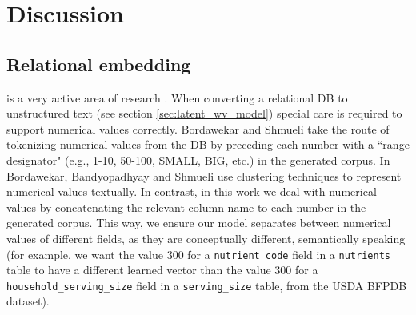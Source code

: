 \chapter{Discussion}
\label{chap:discussion}


\section{Relational embedding} is a very active area of research \cite{DBLP:journals/corr/abs-1803-01384, sigmod2020_keynote, pie2020_keynote}.
When converting a relational DB to unstructured text (see section \ref{sec:latent_wv_model}) special care is required to support numerical values correctly. Bordawekar and Shmueli \cite{DBLP:journals/corr/BordawekarS16} take the route of tokenizing numerical values from the DB by preceding each number with a ``range designator" (e.g., 1-10, 50-100, SMALL, BIG, etc.) in the generated corpus. In \cite{DBLP:journals/corr/abs-1712-07199} Bordawekar, Bandyopadhyay and Shmueli use clustering techniques to represent numerical values textually. In contrast, in this work we deal with numerical values by concatenating the relevant column name to each number in the generated corpus. This way, we ensure our model separates between numerical values of different fields, as they are conceptually different, semantically speaking (for example, we want the value 300 for a \texttt{nutrient\_code} field in a \texttt{nutrients} table to have a different learned vector than the value 300 for a \texttt{household\_serving\_size} field in a \texttt{serving\_size} table, from the USDA BFPDB dataset). 



